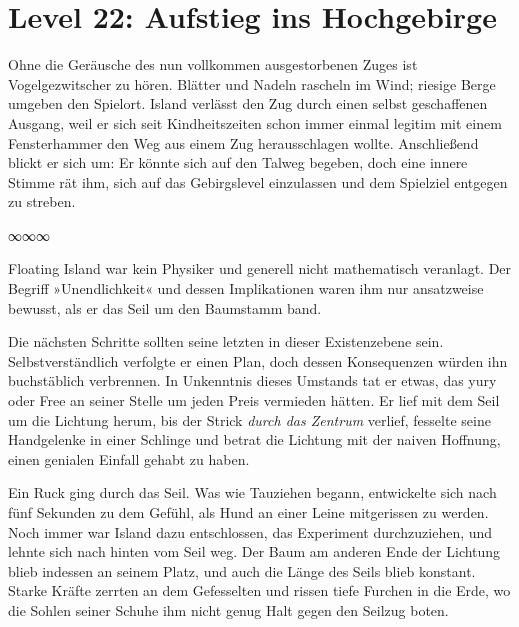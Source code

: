 \section{Level 22: Aufstieg ins Hochgebirge}

Ohne die Geräusche des nun vollkommen ausgestorbenen Zuges ist Vogelgezwitscher zu hören. Blätter und Nadeln rascheln im Wind; riesige Berge umgeben den Spielort. Island verlässt den Zug durch einen selbst geschaffenen Ausgang, weil er sich seit Kindheitszeiten schon immer einmal legitim mit einem Fensterhammer den Weg aus einem Zug herausschlagen wollte. Anschließend blickt er sich um: Er könnte sich auf den Talweg begeben, doch eine innere Stimme rät ihm, sich auf das Gebirgslevel einzulassen und dem Spielziel entgegen zu streben.







\begin{center}
	∞∞∞
\end{center}

Floating Island war kein Physiker und generell nicht mathematisch veranlagt. Der Begriff »Unendlichkeit« und dessen Implikationen waren ihm nur ansatzweise bewusst, als er das Seil um den Baumstamm band.

Die nächsten Schritte sollten seine letzten in dieser Existenzebene sein. Selbstverständlich verfolgte er einen Plan, doch dessen Konsequenzen würden ihn buchstäblich verbrennen. In Unkenntnis dieses Umstands tat er etwas, das yury oder Free an seiner Stelle um jeden Preis vermieden hätten. Er lief mit dem Seil um die Lichtung herum, bis der Strick \emph{durch das Zentrum} verlief, fesselte seine Handgelenke in einer Schlinge und betrat die Lichtung mit der naiven Hoffnung, einen genialen Einfall gehabt zu haben.

Ein Ruck ging durch das Seil. Was wie Tauziehen begann, entwickelte sich nach fünf Sekunden zu dem Gefühl, als Hund an einer Leine mitgerissen zu werden. Noch immer war Island dazu entschlossen, das Experiment durchzuziehen, und lehnte sich nach hinten vom Seil weg. Der Baum am anderen Ende der Lichtung blieb indessen an seinem Platz, und auch die Länge des Seils blieb konstant. Starke Kräfte zerrten an dem Gefesselten und rissen tiefe Furchen in die Erde, wo die Sohlen seiner Schuhe ihm nicht genug Halt gegen den Seilzug boten.


